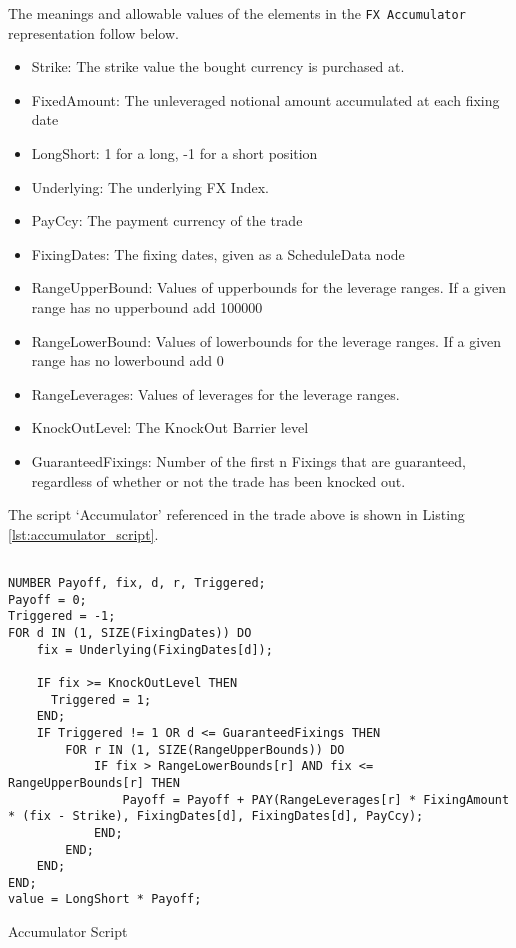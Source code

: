 The meanings and allowable values of the elements in the \verb+FX Accumulator+  representation follow below.

\begin{itemize}
\item Strike: The strike value the bought currency is purchased at.
\item FixedAmount: The unleveraged notional amount accumulated at each fixing date
\item LongShort: 1 for a long, -1 for a short position
\item Underlying: The underlying FX Index.
\item PayCcy: The payment currency of the trade
\item FixingDates: The fixing dates, given as a ScheduleData node
\item RangeUpperBound: Values of upperbounds for the leverage ranges. If a given range has no upperbound add 100000
\item RangeLowerBound: Values of lowerbounds for the leverage ranges. If a given range has no lowerbound add 0
\item RangeLeverages: Values of leverages for the leverage ranges.
\item KnockOutLevel: The KnockOut Barrier level
\item GuaranteedFixings: Number of the first n Fixings that are guaranteed, regardless of whether or not the trade has been knocked out.
\end{itemize}

The script `Accumulator' referenced in the trade above is shown in Listing \ref{lst:accumulator_script}.

\begin{listing}[H]
\begin{verbatim}

NUMBER Payoff, fix, d, r, Triggered;
Payoff = 0;
Triggered = -1;
FOR d IN (1, SIZE(FixingDates)) DO
    fix = Underlying(FixingDates[d]);
    
    IF fix >= KnockOutLevel THEN
      Triggered = 1;
    END;
    IF Triggered != 1 OR d <= GuaranteedFixings THEN
        FOR r IN (1, SIZE(RangeUpperBounds)) DO
            IF fix > RangeLowerBounds[r] AND fix <= RangeUpperBounds[r] THEN
                Payoff = Payoff + PAY(RangeLeverages[r] * FixingAmount * (fix - Strike), FixingDates[d], FixingDates[d], PayCcy);
            END;
        END;
    END;
END;
value = LongShort * Payoff;
\end{verbatim}
\caption{Accumulator Script}
\label{lst:accumulator_script}
\end{listing}

